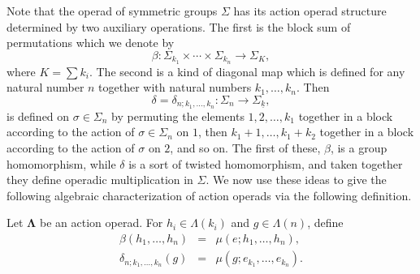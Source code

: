 \documentclass{amsbook} %
\newcommand{\ML}{\mathbf{\Lambda}}
\numberwithin{section}{chapter}
\begin{document}
Note that the operad of symmetric groups $\Sigma$ has its action operad structure determined by two auxiliary operations.  The first is the block sum of permutations which we denote by
\[
\beta \colon \Sigma_{k_{1}} \times \cdots \times \Sigma_{k_{n}} \rightarrow \Sigma_{K},
\]
where $K = \sum k_{i}$.  The second is a kind of diagonal map which is defined for any natural number $n$ together with natural numbers $k_{1}, \ldots, k_{n}$.  Then
\[
\delta = \delta_{n; k_{1}, \ldots, k_{n}} \colon \Sigma_{n} \rightarrow \Sigma_{\underline{k}},
\]
is defined on $\sigma \in \Sigma_{n}$ by permuting the elements $1, 2, \ldots, k_{1}$ together in a block according to the action of $\sigma \in \Sigma_{n}$ on $1$, then $k_{1}+1, \ldots, k_{1}+k_{2}$ together in a block according to the action of $\sigma$ on $2$, and so on.  The first of these, $\beta$, is a group homomorphism, while $\delta$
is a sort of twisted homomorphism, and taken together they define operadic multiplication in $\Sigma$.  We now use these ideas to give the following algebraic characterization of action operads via the following definition.

\begin{Defi}\label{Defi:aop_bl}
Let $\ML$ be an action operad. For $h_i \in \Lambda(k_i)$ and $g \in \Lambda(n)$, define
\[
\begin{array}{rcl}
\beta(h_{1}, \ldots, h_{n}) &=& \mu(e; h_{1}, \ldots, h_{n}), \\
\delta_{n; k_{1}, \ldots, k_{n}}(g) &=& \mu(g; e_{k_1}, \ldots, e_{k_n}).
\end{array}
\]
\end{Defi}
\end{document}
